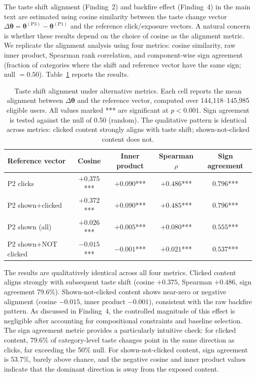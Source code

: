 \documentclass[11pt]{article}
\begin{document}
The taste shift alignment (Finding~2) and backfire effect (Finding~4) in the main text are estimated using cosine similarity between the taste change vector $\Delta\boldsymbol{\theta} = \boldsymbol{\theta}^{(\text{P3})} - \boldsymbol{\theta}^{(\text{P1})}$ and the reference click/exposure vectors. A natural concern is whether these results depend on the choice of cosine as the alignment metric. We replicate the alignment analysis using four metrics: cosine similarity, raw inner product, Spearman rank correlation, and component-wise sign agreement (fraction of categories where the shift and reference vector have the same sign; null $= 0.50$). Table~\ref{tab:metric_robust} reports the results.

\begin{table}[ht]
\centering
\caption{Taste shift alignment under alternative metrics. Each cell reports the mean alignment between $\Delta\boldsymbol{\theta}$ and the reference vector, computed over 144,118--145,985 eligible users. All values marked *** are significant at $p < 0.001$. Sign agreement is tested against the null of 0.50 (random). The qualitative pattern is identical across metrics: clicked content strongly aligns with taste shift; shown-not-clicked content does not.}
\label{tab:metric_robust}
\begin{tabular}{lcccc}
\toprule
Reference vector & Cosine & Inner product & Spearman $\rho$ & Sign agreement \\
\midrule
P2 clicks & $+0.375$*** & $+0.090$*** & $+0.486$*** & $0.796$*** \\
P2 shown+clicked & $+0.372$*** & $+0.090$*** & $+0.485$*** & $0.796$*** \\
P2 shown (all) & $+0.026$*** & $+0.005$*** & $+0.080$*** & $0.555$*** \\
P2 shown+NOT clicked & $-0.015$*** & $-0.001$*** & $+0.021$*** & $0.537$*** \\
\bottomrule
\end{tabular}
\end{table}
\FloatBarrier

The results are qualitatively identical across all four metrics. Clicked content aligns strongly with subsequent taste shift (cosine $+0.375$, Spearman $+0.486$, sign agreement 79.6\%). Shown-not-clicked content shows near-zero or negative alignment (cosine $-0.015$, inner product $-0.001$), consistent with the raw backfire pattern. As discussed in Finding~4, the controlled magnitude of this effect is negligible after accounting for compositional constraints and baseline selection. The sign agreement metric provides a particularly intuitive check: for clicked content, 79.6\% of category-level taste changes point in the same direction as clicks, far exceeding the 50\% null. For shown-not-clicked content, sign agreement is 53.7\%, barely above chance, and the negative cosine and inner product values indicate that the dominant direction is away from the exposed content.
\end{document}
